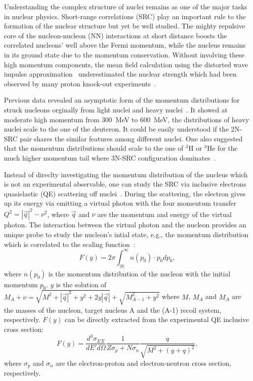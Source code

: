 
Understanding the complex structure of nuclei remains as one of the major tasks in nuclear physics. Short-range correlations (SRC) play an important rule to the formation of the nuclear structure but yet be well studied. The mighty repulsive core of the nucleon-nucleon (NN) interactions at short distance boosts the correlated nucleons' well above the Fermi momentum, while the nucleus remains in its ground state due to the momentum conservation. Without involving these high momentum components, the mean field calculation using the distorted wave impulse approximation~\cite{DeForest1983} underestimated the nuclear strength which had been observed by many proton knock-out experiments~\cite{VanDerSteenhoven1988547,Lapikas1993297,Kelly:1996hd}.

Previous data revealed an asymptotic form of the momentum distributions for struck nucleons orginally from light nuclei and heavy nuclei~\cite{PhysRevC.53.1689}. It showed at moderate high momentum from 300~MeV to 600~MeV, the distributions of heavy nuclei scale to the one of the deuteron. It could be easily understood if the 2N-SRC pair shares the similar features among different nuclei. One also suggested that the momentum distributions should scale to the one of $\mathrm{^{3}H}$ or $\mathrm{^{3}He}$ for the much higher momentum tail where 3N-SRC configuration dominates~\cite{src_john}.

Instead of direclty investigating the momentum distribution of the nucleus which is not an experimental abservable, one can study the SRC via inclusive electrons quasielastic (QE) scattering off nuclei~\cite{RevModPhys.80.189}. During the scattering, the electron gives up its energy via emitting a virtual photon with the four momentum transfer $Q^{2} = |\vec{q}|^{2}-\nu^{2}$, where $\vec{q}$ and $\nu$ are the momentum and energy of the virtual photon. The interaction between the virtual photon and the nucleon provides an unique probe to study the nucleon's intial state, e.g., the momentum distribution which is correlated to the scaling function~\cite{West1975263,day_arns, PhysRevC.41.R2474, Boffi19931,RevModPhys.80.189}:
\begin{equation}
F(y) = 2\pi\int_{|y|}^{\infty}n(p_{0})\cdot p_{0}dp_{0},
	\label{fy_mom_eq}
	\end{equation} 
	where $n(p_{0})$ is the momentum distribution of the nucleon with the initial momentum $p_{0}$. $y$ is the solution of $M_{A}+\nu = \sqrt{M^{2}+|\vec{q}|^{2}+y^{2}+2y|\vec{q}|}+\sqrt{M_{A-1}^{2}+y^{2}}$ where $M$, $M_{A}$ and $M_{A}$ are the masses of the nucleon, target nucleus A and the (A-1) recoil system, respectively. $F(y)$ can be directly extracted from the experimental QE inclusive cross section:
	\begin{equation}
	F(y)=\frac{d^{3}\sigma_{EX}}{dE' d\Omega } \frac{1}{Z\sigma_{p}+N\sigma_{n}} \frac{q}{\sqrt{M^{2}+(y+q)^{2}}},
	\label{fy_scaling_eq2}
	\end{equation}
	where $\sigma_{p}$ and $\sigma_{n}$ are the electron-proton and electron-neutron cross section, respectively.


